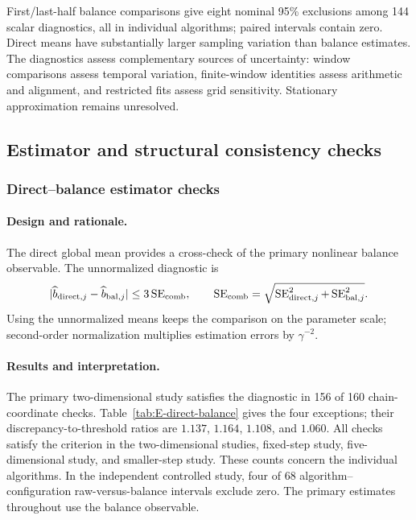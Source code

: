 First/last-half balance comparisons give eight nominal 95\% exclusions
among 144 scalar diagnostics, all in individual algorithms; paired
intervals contain zero. Direct means have substantially larger sampling
variation than balance estimates. The diagnostics assess complementary
sources of uncertainty: window comparisons assess temporal variation,
finite-window identities assess arithmetic and alignment, and restricted
fits assess grid sensitivity. Stationary approximation remains unresolved.

\subsection{Estimator and structural consistency checks}
\label{app:num-consistency}

\subsubsection{Direct--balance estimator checks}
\label{app:direct-balance-diagnostic}

\paragraph{Design and rationale.}
The direct global mean provides a cross-check of the primary nonlinear
balance observable. The unnormalized diagnostic is
\[
 |\widehat b_{{\rm direct},j}-\widehat b_{{\rm bal},j}|
 \le3\operatorname{SE}_{\rm comb},\qquad
 \operatorname{SE}_{\rm comb}
 =\sqrt{\operatorname{SE}_{{\rm direct},j}^2+
         \operatorname{SE}_{{\rm bal},j}^2}.
\]
Using the unnormalized means keeps the comparison on the parameter scale;
second-order normalization multiplies estimation errors by $\gamma^{-2}$.

\paragraph{Results and interpretation.}
The primary two-dimensional \FedAvg{} study satisfies the diagnostic in
156 of 160 chain-coordinate checks. Table~\ref{tab:E-direct-balance}
gives the four exceptions; their discrepancy-to-threshold ratios are
$1.137$, $1.164$, $1.108$, and $1.060$. All checks satisfy the criterion
in the two-dimensional \Scaf{} studies, fixed-step study,
five-dimensional \Scaf{} study, and smaller-step \FedAvg{} study.
These counts concern the individual algorithms. In the independent
controlled study, four of 68 algorithm--configuration raw-versus-balance
intervals exclude zero. The primary estimates throughout use the
balance observable.

